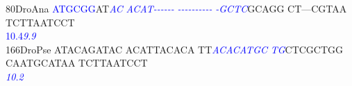 \documentclass[11pt,twoside,reqno,a4paper]{article}
\begin{document}
{80\hspace*{2\charwidth}DroAna	\textcolor{Blue}{A}\textcolor{Blue}{T}\textcolor{Blue}{G}\textcolor{Blue}{C}\textcolor{Blue}{G}\textcolor{Blue}{G}AT\textit{\textcolor{Blue}{A}}\textit{\textcolor{Blue}{C}}	\textit{\textcolor{Blue}{A}}\textit{\textcolor{Blue}{C}}\textit{\textcolor{Blue}{A}}\textit{\textcolor{Blue}{T}}\textit{\textcolor{Blue}{-}}\textit{\textcolor{Blue}{-}}\textit{\textcolor{Blue}{-}}\textit{\textcolor{Blue}{-}}\textit{\textcolor{Blue}{-}}\textit{\textcolor{Blue}{-}}	\textit{\textcolor{Blue}{-}}\textit{\textcolor{Blue}{-}}\textit{\textcolor{Blue}{-}}\textit{\textcolor{Blue}{-}}\textit{\textcolor{Blue}{-}}\textit{\textcolor{Blue}{-}}\textit{\textcolor{Blue}{-}}\textit{\textcolor{Blue}{-}}\textit{\textcolor{Blue}{-}}\textit{\textcolor{Blue}{-}}	\textit{\textcolor{Blue}{-}}\textit{\textcolor{Blue}{G}}\textit{\textcolor{Blue}{C}}\textit{\textcolor{Blue}{T}}\textit{\textcolor{Blue}{C}}GCAGG	CT---CGTAA	TCTTAATCCT	\\
\hspace*{4\charwidth}\hspace*{7\charwidth}\hspace*{0\charwidth}\textcolor{Blue}{10.4}\hspace*{4\charwidth}\textit{\textcolor{Blue}{9.9}}\hspace*{1\charwidth}\hspace*{1\charwidth}\hspace*{1\charwidth}\hspace*{1\charwidth}\hspace*{1\charwidth}\hspace*{1\charwidth}\\
166\hspace*{1\charwidth}DroPse	ATACAGATAC	ACATTACACA	TT\textit{\textcolor{Blue}{A}}\textit{\textcolor{Blue}{C}}\textit{\textcolor{Blue}{A}}\textit{\textcolor{Blue}{C}}\textit{\textcolor{Blue}{A}}\textit{\textcolor{Blue}{T}}\textit{\textcolor{Blue}{G}}\textit{\textcolor{Blue}{C}}	\textit{\textcolor{Blue}{T}}\textit{\textcolor{Blue}{G}}CTCGCTGG	CAATGCATAA	TCTTAATCCT	\\
\hspace*{4\charwidth}\hspace*{7\charwidth}\hspace*{1\charwidth}\hspace*{1\charwidth}\hspace*{22\charwidth}\textit{\textcolor{Blue}{10.2}}\hspace*{1\charwidth}\hspace*{1\charwidth}\hspace*{1\charwidth}\hspace*{1\charwidth}\\
}
\end{document}
